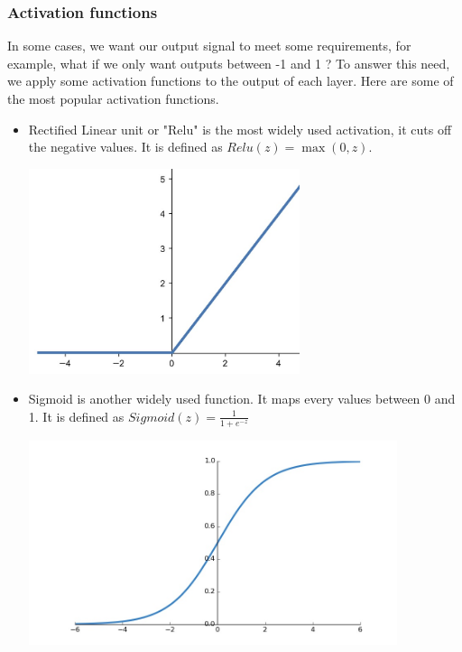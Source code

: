 \documentclass[12pt]{article}
\begin{document}
\subsubsection{Activation functions}
In some cases, we want our output signal to meet some requirements, for example, what if we only want outputs between -1 and 1 ? To answer this need, we apply some activation functions to the output of each layer. Here are some of the most popular activation functions. \\
\begin{itemize}

\newpage

\item Rectified Linear unit or "Relu" is the most widely used activation, it cuts off the negative values. It is defined as $ Relu(z) = \max(0, z)$. \\
\centerline{\includegraphics[height=6cm]{../../docs/relu.png}}

\item Sigmoid is another widely used function. It maps every values between 0 and 1. It is defined as $ Sigmoid(z) = \frac{1} {1 + e^{-z}}$ \\
\centerline{\includegraphics[height=6cm]{../../docs/sigmoid.png}}


\end{itemize}
\end{document}
